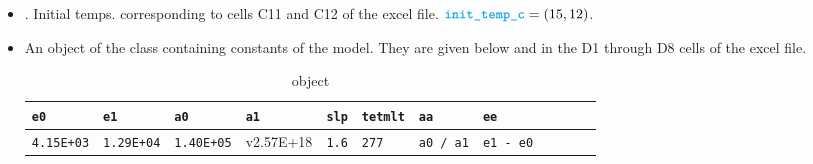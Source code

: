 \begin{enumerate}
\begin{itemize}
\item {}. Initial temps. corresponding to cells C11 and C12 
of the excel file. $\vari{init\_{temp\_c}} = (15, 12)$.

\item {} An object of the class  containing 
constants of the model. They are given below and in 
the D1 through D8 cells of the excel
file.
\iffalse
\begin{align*}
\vari{const} 
&=  \begin{bmatrix}
           \vari{e0} \\
           \vari{e1} \\
           \vari{a0}\\
           \vari{a1}\\
           \vari{slp}\\
           \vari{tetmlt}\\
           \vari{aa}\\
           \vari{ee}
         \end{bmatrix}  =
      \begin{bmatrix}
           4.15E+03 \\
           1.29E+04\\
           1.40E+05 \\
           2.57E+18\\
           1.6\\
           277\\
           \vari{a0} / \vari{a1}\\
           \vari{e1} - \vari{e0}
         \end{bmatrix}
\end{align*}
\fi

\begin{table}[!htb]
\caption{ object}
\begin{center}
    \begin{tabular}{| l | l | l | l | l | l| l| l| l | l | l | p{1cm} |}
     \hline
    \scriptsize{\texttt{e0}} & \scriptsize{\texttt{e1}} & \scriptsize{\texttt{a0}} & \scriptsize{\texttt{a1}} & \scriptsize{\texttt{slp}} & \scriptsize{\texttt{tetmlt}} & \scriptsize{\texttt{aa}} & \scriptsize{\texttt{ee}} \\ \hline
             \scriptsize{\texttt{4.15E+03}} & \scriptsize{\texttt{1.29E+04}} & \scriptsize{\texttt{1.40E+05}} & \scriptsize{v{2.57E+18}} & \scriptsize{\texttt{1.6}} & \scriptsize{\texttt{277}} & \scriptsize{\texttt{a0 / a1}} & \scriptsize{\texttt{e1 - e0}}  \\ \hline
    \end{tabular}
\end{center}
 \label{table:None}
\end{table}


\end{itemize}
\end{enumerate}

